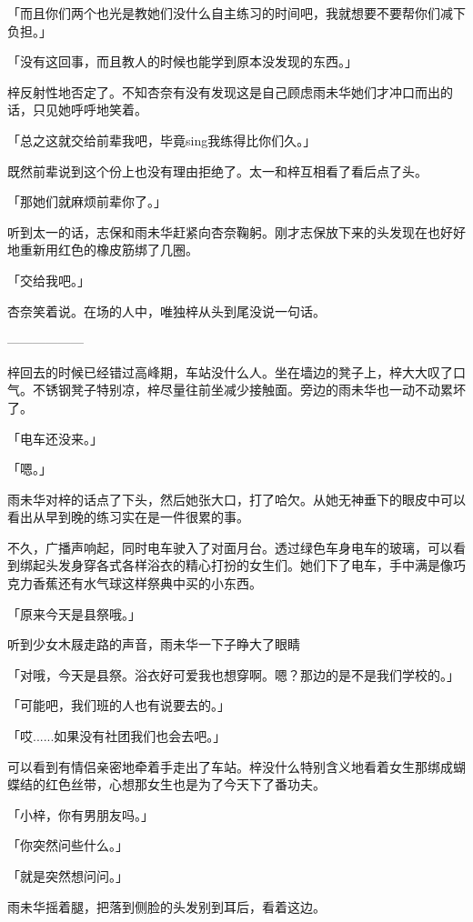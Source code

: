 \documentclass[UTF8]{ctexart}
\begin{document}
    「而且你们两个也光是教她们没什么自主练习的时间吧，我就想要不要帮你们减下负担。」

    「没有这回事，而且教人的时候也能学到原本没发现的东西。」

    梓反射性地否定了。不知杏奈有没有发现这是自己顾虑雨未华她们才冲口而出的话，只见她呼呼地笑着。

    「总之这就交给前辈我吧，毕竟sing我练得比你们久。」

    既然前辈说到这个份上也没有理由拒绝了。太一和梓互相看了看后点了头。

    「那她们就麻烦前辈你了。」

    听到太一的话，志保和雨未华赶紧向杏奈鞠躬。刚才志保放下来的头发现在也好好地重新用红色的橡皮筋绑了几圈。

    「交给我吧。」

    杏奈笑着说。在场的人中，唯独梓从头到尾没说一句话。

    ——————

    梓回去的时候已经错过高峰期，车站没什么人。坐在墙边的凳子上，梓大大叹了口气。不锈钢凳子特别凉，梓尽量往前坐减少接触面。旁边的雨未华也一动不动累坏了。

    「电车还没来。」

    「嗯。」

    雨未华对梓的话点了下头，然后她张大口，打了哈欠。从她无神垂下的眼皮中可以看出从早到晚的练习实在是一件很累的事。

    不久，广播声响起，同时电车驶入了对面月台。透过绿色车身电车的玻璃，可以看到绑起头发身穿各式各样浴衣的精心打扮的女生们。她们下了电车，手中满是像巧克力香蕉还有水气球这样祭典中买的小东西。

    「原来今天是县祭哦。」

    听到少女木屐走路的声音，雨未华一下子睁大了眼睛

    「对哦，今天是县祭。浴衣好可爱我也想穿啊。嗯？那边的是不是我们学校的。」

    「可能吧，我们班的人也有说要去的。」

    「哎......如果没有社团我们也会去吧。」

    可以看到有情侣亲密地牵着手走出了车站。梓没什么特别含义地看着女生那绑成蝴蝶结的红色丝带，心想那女生也是为了今天下了番功夫。

    「小梓，你有男朋友吗。」

    「你突然问些什么。」

    「就是突然想问问。」

    雨未华摇着腿，把落到侧脸的头发别到耳后，看着这边。
\end{document}
